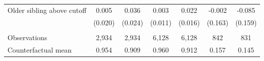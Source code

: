 {{\begin{tabular}{lcccccc}
Older sibling above cutoff&       0.005   &       0.036   &       0.003   &       0.022   &      -0.002   &      -0.085   \\
                    &     (0.020)   &     (0.024)   &     (0.011)   &     (0.016)   &     (0.163)   &     (0.159)   \\
                    &               &               &               &               &               &               \\
Observations        &       2,934   &       2,934   &       6,128   &       6,128   &         842   &         831   \\
Counterfactual mean &       0.954   &       0.909   &       0.960   &       0.912   &       0.157   &       0.145   \\
 

\bottomrule
\end{tabular}
}
}
